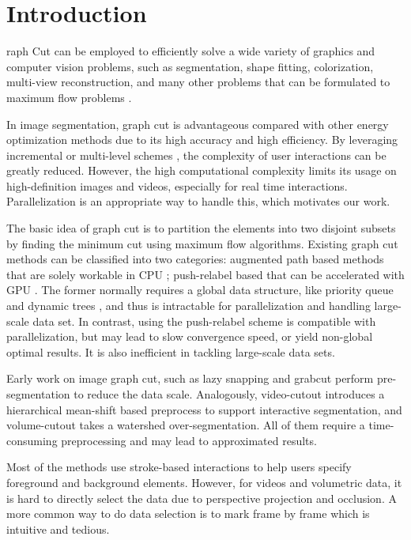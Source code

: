 
\section{Introduction}
\label{section introduction}

raph Cut can be employed to efficiently solve a wide variety of graphics and computer vision problems, such as segmentation, shape fitting, colorization, multi-view reconstruction, and many other problems that can be formulated to maximum flow problems \cite{12JSH}.

In image segmentation, graph cut is advantageous compared with other energy optimization methods due to its high accuracy and high efficiency.
By leveraging incremental or multi-level schemes \cite{04LSTS, 05LSGX}, the complexity of user interactions can be greatly reduced.
However, the high computational complexity limits its usage on high-definition images and videos, especially for real time interactions.
Parallelization is an appropriate way to handle this, which motivates our work.

The basic idea of graph cut is to partition the elements into two disjoint subsets by finding the minimum cut using maximum flow algorithms. Existing graph cut methods can be classified into two categories: augmented path based methods that are solely workable in CPU \cite{04BK, 10LS, 12JSH}; push-relabel based that can be accelerated with GPU \cite{08VN, 11W}.
The former normally requires a global data structure, like priority queue and dynamic trees \cite{70D}, and thus is intractable for parallelization and handling large-scale data set.
In contrast, using the push-relabel scheme is compatible with parallelization, but may lead to slow convergence speed, or yield non-global optimal results.
It is also inefficient in tackling large-scale data sets.

Early work on image graph cut, such as lazy snapping \cite{04LSTS} and grabcut \cite{04RKB} perform pre-segmentation to reduce the data scale.
Analogously, video-cutout \cite{05WBCAC} introduces a hierarchical mean-shift based preprocess to support interactive segmentation, and volume-cutout \cite{05YZNC} takes a watershed over-segmentation.
All of them require a time-consuming preprocessing and may lead to approximated results.

Most of the methods use stroke-based interactions to help users specify foreground and background elements.
However, for videos and volumetric data, it is hard to directly select the data due to perspective projection and occlusion.
A more common way to do data selection is to mark frame by frame which is intuitive and tedious.

